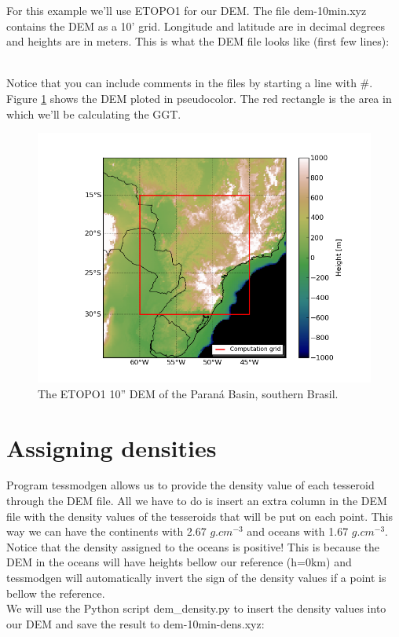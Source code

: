 \documentclass[a4paper]{article}
\begin{document}
For this example we'll use ETOPO1 for our DEM.
The file dem-10min.xyz contains the DEM as a 10' grid. Longitude and latitude are
in decimal degrees and heights are in meters.
This is what the DEM file looks like (first few lines):



\hfill\\
\noindent Notice that you can include comments in the files by starting a line
with \#.
Figure \ref{fig:dem} shows the DEM ploted in pseudocolor. The red rectangle is
the area in which we'll be calculating the GGT.

\begin{figure}[htb]
    \centering
        \includegraphics[width=\textwidth]{dem-10min.png}
    \caption{The ETOPO1 10'' DEM of the Paran\'a Basin, southern Brasil.
    \label{fig:dem}}
\end{figure}

\section{Assigning densities}

Program tessmodgen allows us to provide the density value of each tesseroid
through the DEM file. All we have to do is insert an extra column in the DEM
file with the density values of the tesseroids that will be put on each point.
This way we can have the continents with 2.67 $g.cm^{-3}$ and oceans with 1.67 $g.cm^{-3}$.
Notice that the density assigned to the oceans is positive! This is because the
DEM in the oceans will have heights bellow our reference (h=0km) and tessmodgen
will automatically invert the sign of the density values if a point is bellow the reference.
\\
\indent We will use the Python script dem\_density.py to insert the density values into our
DEM and save the result to dem-10min-dens.xyz:
\end{document}
